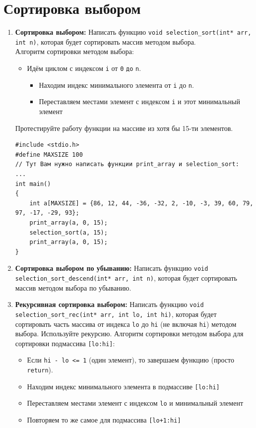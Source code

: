 \documentclass{article}
\begin{document}
\section*{Сортировка выбором}
\begin{enumerate}
\item \textbf{Сортировка выбором:} Написать функцию \texttt{void selection\_sort(int* arr, int n)}, которая будет сортировать массив методом выбора. \\
Алгоритм сортировки методом выбора:
\begin{itemize}
\item Идём циклом с индексом \texttt{i} от \texttt{0} \texttt{до} \texttt{n}.\\
\begin{itemize}
\item Находим индекс минимального элемента от \texttt{i} до \texttt{n}.\\
\item Переставляем местами элемент с индексом \texttt{i} и этот минимальный элемент\\
\end{itemize}
\end{itemize}
Протестируйте работу функции на массиве из хотя бы 15-ти элементов.
\begin{lstlisting}
#include <stdio.h>
#define MAXSIZE 100
// Тут Вам нужно написать функции print_array и selection_sort:
...
int main() 
{
	int a[MAXSIZE] = {86, 12, 44, -36, -32, 2, -10, -3, 39, 60, 79, 97, -17, -29, 93};
	print_array(a, 0, 15);
	selection_sort(a, 15);
	print_array(a, 0, 15);
}
\end{lstlisting}



\item \textbf{Сортировка выбором по убыванию:} Написать функцию \texttt{void selection\_sort\_descend(int* arr, int n)}, которая будет сортировать массив методом выбора по убыванию.

\item \textbf{Рекурсивная сортировка выбором:} Написать функцию \texttt{void selection\_sort\_rec(int* arr, int lo, int hi)}, которая будет сортировать часть массива от индекса \texttt{lo} до \texttt{hi} (не включая \texttt{hi}) методом выбора. Используйте рекурсию.
Алгоритм сортировки методом выбора для сортировки подмассива \texttt{[lo:hi]}:
\begin{itemize}
\item Если \texttt{hi - lo <= 1} (один элемент), то завершаем функцию (просто \texttt{return}).
\item Находим индекс минимального элемента в подмассиве \texttt{[lo:hi]} 
\item Переставляем местами элемент с индексом \texttt{lo} и минимальный элемент
\item Повторяем то же самое для подмассива \texttt{[lo+1:hi]} 
\end{itemize}
\end{enumerate}
\newpage
\end{document}
